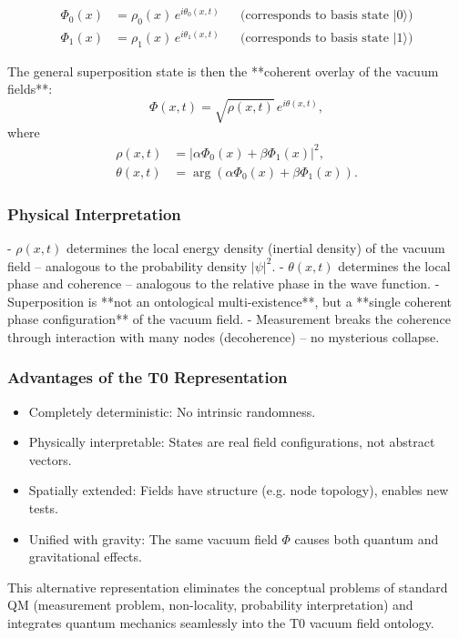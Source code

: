 	\begin{align}
		\Phi_0(x) &= \rho_0(x) \, e^{i \theta_0(x,t)} && \text{(corresponds to basis state } |0\rangle\text{)} \\
		\Phi_1(x) &= \rho_1(x) \, e^{i \theta_1(x,t)} && \text{(corresponds to basis state } |1\rangle\text{)}
	\end{align}
	
	The general superposition state is then the **coherent overlay of the vacuum fields**:
	\[
	\Phi(x,t) = \sqrt{\rho(x,t)} \, e^{i \theta(x,t)},
	\]
	where
	\begin{align}
		\rho(x,t) &= |\alpha \Phi_0(x) + \beta \Phi_1(x)|^2, \\
		\theta(x,t) &= \arg(\alpha \Phi_0(x) + \beta \Phi_1(x)).
	\end{align}
	
	\subsubsection{Physical Interpretation}
	
	- $\rho(x,t)$ determines the local energy density (inertial density) of the vacuum field – analogous to the probability density $|\psi|^2$.
	- $\theta(x,t)$ determines the local phase and coherence – analogous to the relative phase in the wave function.
	- Superposition is **not an ontological multi-existence**, but a **single coherent phase configuration** of the vacuum field.
	- Measurement breaks the coherence through interaction with many nodes (decoherence) – no mysterious collapse.
	
	\subsubsection{Advantages of the T0 Representation}
	
	\begin{itemize}
		\item Completely deterministic: No intrinsic randomness.
		\item Physically interpretable: States are real field configurations, not abstract vectors.
		\item Spatially extended: Fields have structure (e.g. node topology), enables new tests.
		\item Unified with gravity: The same vacuum field $\Phi$ causes both quantum and gravitational effects.
	\end{itemize}
	
	This alternative representation eliminates the conceptual problems of standard QM (measurement problem, non-locality, probability interpretation) and integrates quantum mechanics seamlessly into the T0 vacuum field ontology.
	
